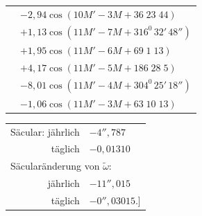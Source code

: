\begin{landscape}
\begin{longtable}{@{}r@{}l@{}}
&\(-2{,}94\cos(10M'-3M+36\;23\;44)\)\\[3pt]
&\(+1{,}13\cos(11M'-7M+316^0\,32'\,48'')\)\\
&\(+1{,}95\cos(11M'-6M+69\;1\;13)\)\\
&\(+4{,}17\cos(11M'-5M+186\;28\;5)\)\\
&\(-8{,}01\cos(11M'-4M+304^0\,25'\,18'')\)\\
&\(-1{,}06\cos(11M'-3M+63\;10\;13)\)
\end{longtable}
\begin{center}
\begin{tabular}{rl}
Säcular: jährlich&\(-4''{,}787\)\\
täglich&\(-0{,}01310\)\\[4pt]
\multicolumn{2}{l}{Säcularänderung von \(\tilde\omega\):}\\[4pt]
jährlich&\(-11''{,}015\)\\
täglich&\(-0''{,}03015\).]
\end{tabular}
\end{center}
\endgroup
\clearpage
\endgroup
\end{landscape}
